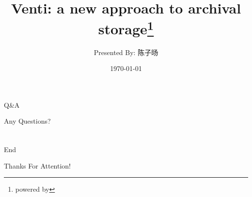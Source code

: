 \documentclass[mathserif]{beamer}
\title[Venti]{Venti: a new approach to archival storage\thanks{powered by \XeLaTeX}}
\author{Presented By: 陈子旸}
\institute[FDU]
{
	Fudan University\\
	\medskip
	\textit{13307130148@fudan.edu.cn}
}
\date{\today}
\begin{document}
\newtheorem{property}[theorem]{\textsc{Property}}
\newtheorem{defination}[theorem]{\textsc{Defination}}
\newtheorem{theore}[theorem]{\textsc{Theorem}}
\newtheorem{lemm}[theorem]{\textsc{Lemma}}

\begin{frame}
\titlepage
\end{frame}




\AtBeginSection{}

\section[Q\&{}A]{}
\begin{frame}{Q\&{}A}
\begin{center}
  \color{blue}\huge{Any Questions?}
\end{center}
\end{frame}

\section[End]{}
\begin{frame}{End}
\begin{center}
  \color{blue}\huge{Thanks For Attention!}
\end{center}
\end{frame}
\end{document}
